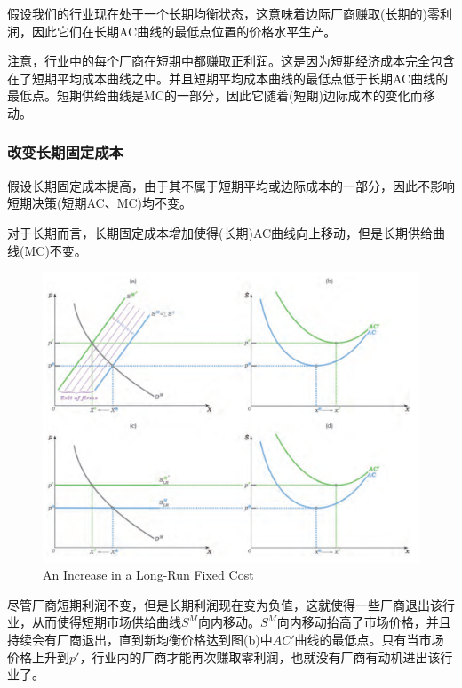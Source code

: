 \documentclass{article}
\begin{document}
假设我们的行业现在处于一个长期均衡状态，这意味着边际厂商赚取(长期的)零利润，因此它们在长期AC曲线的最低点位置的价格水平生产。

注意，行业中的每个厂商在短期中都赚取正利润。这是因为短期经济成本完全包含在了短期平均成本曲线之中。并且短期平均成本曲线的最低点低于长期AC曲线的最低点。短期供给曲线是MC的一部分，因此它随着(短期)边际成本的变化而移动。

\subsubsection{改变长期固定成本}

假设长期固定成本提高，由于其不属于短期平均或边际成本的一部分，因此不影响短期决策(短期AC、MC)均不变。

对于长期而言，长期固定成本增加使得(长期)AC曲线向上移动，但是长期供给曲线(MC)不变。

\begin{figure}[H] %
	\centering %
	\includegraphics[width=1\textwidth]{14_4} %
	\caption{An Increase in a Long-Run Fixed Cost} %
	\label{Fig.main5} %
\end{figure}

尽管厂商短期利润不变，但是长期利润现在变为负值，这就使得一些厂商退出该行业，从而使得短期市场供给曲线$ S^M $向内移动。$ S^M $向内移动抬高了市场价格，并且持续会有厂商退出，直到新均衡价格达到图(b)中$ AC' $曲线的最低点。只有当市场价格上升到$ p' $，行业内的厂商才能再次赚取零利润，也就没有厂商有动机进出该行业了。
\end{document}
